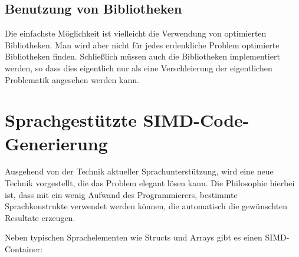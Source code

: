 \documentclass[a4paper,10pt]{article}
\begin{document}
\subsection{Benutzung von Bibliotheken}

Die einfachste Möglichkeit ist vielleicht die Verwendung von optimierten Bibliotheken. Man wird aber
nicht für jedes erdenkliche Problem optimierte Bibliotheken finden. Schließlich müssen auch die
Bibliotheken implementiert werden, so dass dies eigentlich nur als eine Verschleierung der
eigentlichen Problematik angesehen werden kann.

\newpage
\section{Sprachgestützte SIMD-Code-Generierung}

Ausgehend von der Technik aktueller Sprachunterstützung, wird eine neue Technik vorgestellt, die das Problem
elegant lösen kann. Die Philosophie hierbei ist, dass mit ein wenig Aufwand des Programmierers, bestimmte
Sprachkonstrukte verwendet werden können, die automatisch die gewünschten Resultate erzeugen.

Neben typischen Sprachelementen wie Structs und Arrays gibt es einen SIMD-Container:
\end{document}
